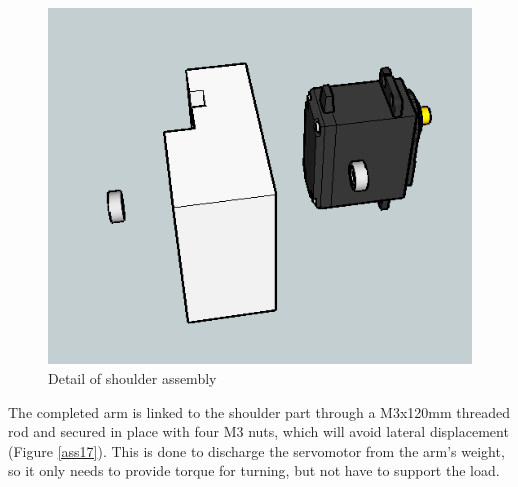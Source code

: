 	\begin{figure}[H]
			\centering
			\includegraphics[scale=0.5]{images/Assembly/15.png}
			\caption{Detail of shoulder assembly }
			\label{ass15}
	\end{figure}
	\bigskip



The completed arm is linked to the shoulder part through a M3x120mm threaded rod and secured in place with four M3 nuts, which will avoid lateral displacement  (Figure \ref{ass17}). This is done to discharge the servomotor from the arm's weight, so it only needs to provide torque for turning, but not have to support the load.\\

